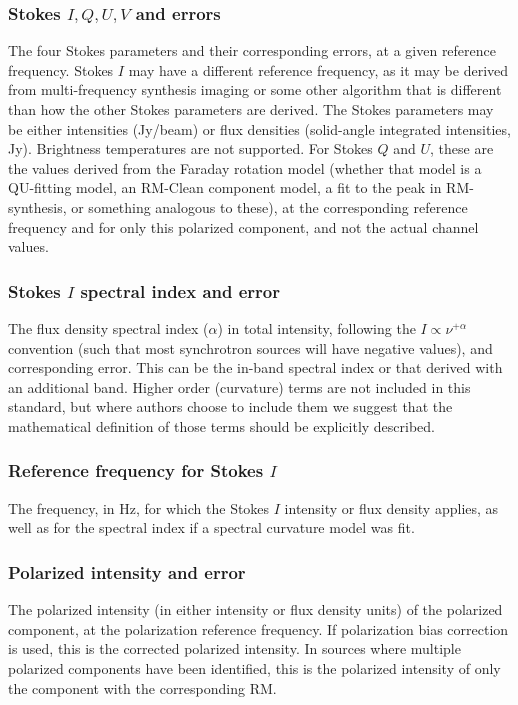 \documentclass[10pt,modern]{aastex63}
\begin{document}
\subsubsection{Stokes $I, Q, U, V$ and errors}
The four Stokes parameters and their corresponding errors, at a given reference frequency. Stokes $I$ may have a different reference frequency, as it may be derived from multi-frequency synthesis imaging or some other algorithm that is different than how the other Stokes parameters are derived. The Stokes parameters may be either intensities (Jy/beam) or flux densities (solid-angle integrated intensities, Jy). Brightness temperatures are not supported. For Stokes $Q$ and $U$, these are the values derived from the Faraday rotation model (whether that model is a QU-fitting model, an RM-Clean \citep{Heald09} component model, a fit to the peak in RM-synthesis, or something analogous to these), at the corresponding reference frequency and for only this polarized component, and not the actual channel values.

\subsubsection{Stokes $I$ spectral index and error}
The flux density spectral index ($\alpha$) in total intensity, following the $I \propto \nu^{+\alpha}$ convention (such that most synchrotron sources will have negative values), and corresponding error. This can be the in-band spectral index or that derived with an additional band. Higher order (curvature) terms are not included in this standard, but where authors choose to include them we suggest that the mathematical definition of those terms should be explicitly described.

\subsubsection{Reference frequency for Stokes $I$}
The frequency, in Hz, for which the Stokes $I$ intensity or flux density applies, as well as for the spectral index if a spectral curvature model was fit.

\subsubsection{Polarized intensity and error}
The polarized intensity (in either intensity or flux density units) of the polarized component, at the polarization reference frequency. If polarization bias correction is used, this is the corrected polarized intensity. In sources where multiple polarized components have been identified, this is the polarized intensity of only the component with the corresponding RM.
\end{document}
